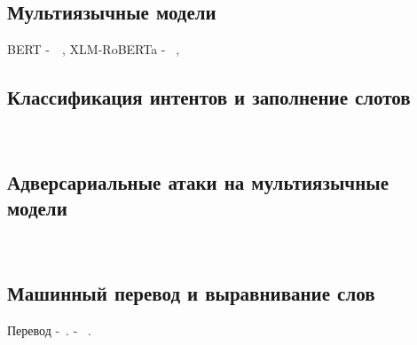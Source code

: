 \subsection{Мультиязычные модели}
BERT -~\cite{devlin-etal-2019-bert,Liu2020WhatMM, Wu2019BetoBB}~, XLM-RoBERTa - ~\cite{Conneau2020UnsupervisedCR},
\subsection{Классификация интентов и заполнение слотов}
~\cite{Weld2021ASO}
\subsection{Адверсариальные атаки на мультиязычные модели}
~\cite{Tan2021CodeMixingOS,Krishnan2021MultilingualCF}
\subsection{Машинный перевод и выравнивание слов}
Перевод -~\cite{Fan2020BeyondEM}.
 - ~\cite{Dou2021WordAB}.

